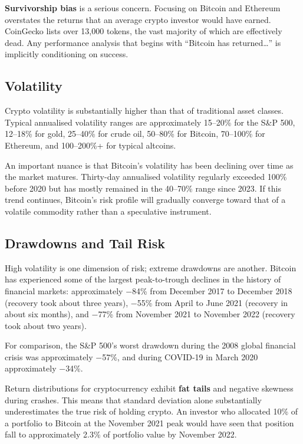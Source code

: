 \documentclass[11pt,a4paper]{article}
\newcommand{\keyword}[1]{\textbf{\textcolor{AccentOrange}{#1}}}
\begin{document}
\keyword{Survivorship bias} is a serious concern. Focusing on Bitcoin and Ethereum overstates the returns that an average crypto investor would have earned. CoinGecko lists over 13,000 tokens, the vast majority of which are effectively dead. Any performance analysis that begins with ``Bitcoin has returned\ldots'' is implicitly conditioning on success.

\subsection{Volatility}

Crypto volatility is substantially higher than that of traditional asset classes. Typical annualised volatility ranges are approximately 15--20\% for the S\&P 500, 12--18\% for gold, 25--40\% for crude oil, 50--80\% for Bitcoin, 70--100\% for Ethereum, and 100--200\%+ for typical altcoins.

An important nuance is that Bitcoin's volatility has been declining over time as the market matures. Thirty-day annualised volatility regularly exceeded 100\% before 2020 but has mostly remained in the 40--70\% range since 2023. If this trend continues, Bitcoin's risk profile will gradually converge toward that of a volatile commodity rather than a speculative instrument.

\subsection{Drawdowns and Tail Risk}

High volatility is one dimension of risk; extreme drawdowns are another. Bitcoin has experienced some of the largest peak-to-trough declines in the history of financial markets: approximately $-$84\% from December 2017 to December 2018 (recovery took about three years), $-$55\% from April to June 2021 (recovery in about six months), and $-$77\% from November 2021 to November 2022 (recovery took about two years).

For comparison, the S\&P 500's worst drawdown during the 2008 global financial crisis was approximately $-$57\%, and during COVID-19 in March 2020 approximately $-$34\%.

Return distributions for cryptocurrency exhibit \keyword{fat tails} and negative skewness during crashes. This means that standard deviation alone substantially underestimates the true risk of holding crypto. An investor who allocated 10\% of a portfolio to Bitcoin at the November 2021 peak would have seen that position fall to approximately 2.3\% of portfolio value by November 2022.
\end{document}
